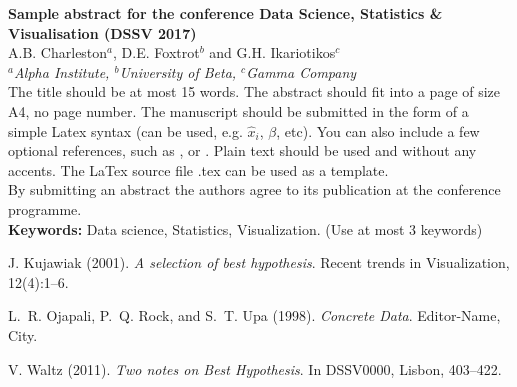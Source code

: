 
\setlength{\textwidth}{160mm}\setlength{\textheight}{240mm}
\setlength{\oddsidemargin}{0mm}\setlength{\evensidemargin}{0mm}
\setlength{\topmargin}{-10mm}
\setlength{\parindent}{0mm} 
\pagestyle{empty}	%



{\Large\bf Sample abstract for the conference Data Science, Statistics \& Visualisation (DSSV 2017) }\\[4mm]

A.B. Charleston$^a$, D.E. Foxtrot$^b$ and G.H. Ikariotikos$^c$\\ 				

{\small \em $^a$Alpha Institute, $^b$University of Beta, $^c$Gamma 
Company}\\[3mm]


The title should be at most 15 words.
The abstract should fit into a page of size A4, no page number. The manuscript should be submitted in the 
form of a simple Latex syntax (can be used, e.g. $\hat{x}_i$, $\beta$, etc). You can also 
include a few optional references, such as \cite{journal01}, \cite{book98} or \cite{procc11}. Plain text should be used and without any accents. The LaTex source file .tex can be used as a 
template.\\

By submitting an abstract the authors agree to its publication at 
the conference programme.\\

\textbf{Keywords:} Data science, Statistics, Visualization. (Use at most 3 keywords)

\begin{thebibliography}{00}
 J. Kujawiak (2001). \emph{A selection of best hypothesis}. Recent trends in Visualization, 12(4):1--6.

L.~R. Ojapali, P.~Q. Rock, and S.~T. Upa (1998). \emph{Concrete Data}. Editor-Name, City.

 V. Waltz (2011). \emph{Two notes on Best Hypothesis}. In DSSV0000, Lisbon, 403--422.
\end{thebibliography}



